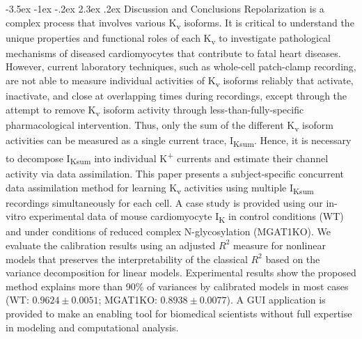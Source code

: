 \documentclass[11pt]{article}
\makeatletter
\renewcommand\section{\@startsection {section}{1}{\z@}%
                                   {-3.5ex \@plus -1ex \@minus -.2ex}%
                                   {2.3ex \@plus.2ex}%
                                   {\normalfont\fontfamily{phv}\fontsize{16}{19}\bfseries}}
\makeatother
\begin{document}
\section{Discussion and Conclusions}
Repolarization is a complex process that involves various K\textsubscript{v} isoforms. It is critical to understand the unique properties and functional roles of each K\textsubscript{v} to investigate pathological mechanisms of diseased cardiomyocytes that contribute to fatal heart diseases. However, current laboratory techniques, such as whole-cell patch-clamp recording, are not able to measure individual activities of K\textsubscript{v} isoforms reliably that activate, inactivate, and close at overlapping times during recordings, except through the attempt to remove K\textsubscript{v} isoform activity through less-than-fully-specific pharmacological intervention. Thus, only the sum of the different K\textsubscript{v} isoform activities can be measured as a single current trace, I\textsubscript{Ksum}. Hence, it is necessary to decompose I\textsubscript{Ksum} into individual K\textsuperscript{+} currents and estimate their channel activity via data assimilation. This paper presents a subject-specific concurrent data assimilation method for learning K\textsubscript{v} activities using multiple I\textsubscript{Ksum} recordings simultaneously for each cell. A case study is provided using our in-vitro experimental data of mouse cardiomyocyte I\textsubscript{K} in control conditions (WT) and under conditions of reduced complex N-glycosylation (MGAT1KO). We evaluate the calibration results using an adjusted $R^2$ measure for nonlinear models that preserves the interpretability of the classical $R^2$ based on the variance decomposition for linear models. Experimental results show the proposed method explains more than 90\% of variances by calibrated models in most cases (WT: $0.9624 \pm 0.0051$; MGAT1KO: $0.8938 \pm 0.0077$). A GUI application is provided to make an enabling tool for biomedical scientists without full expertise in modeling and computational analysis.   
\end{document}
